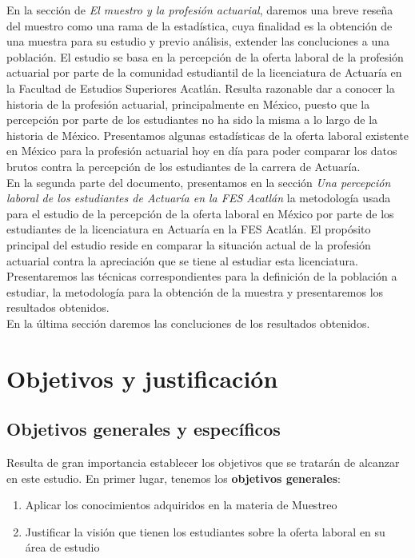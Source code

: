 \documentclass[a4paper]{article}
\begin{document}
En la sección de \textit{El muestro y la profesión actuarial}, daremos una breve reseña del muestro como una rama de la estadística, cuya finalidad es la obtención de una muestra para su estudio y previo análisis, extender las concluciones a una población. El estudio se basa en la percepción de la oferta laboral de la profesión actuarial por parte de la comunidad estudiantil de la licenciatura de Actuaría en la Facultad de Estudios Superiores Acatlán.
Resulta razonable dar a conocer la historia de la profesión actuarial, principalmente en México, puesto que la percepción por parte de los estudiantes no ha sido la misma a lo largo de la historia de México. Presentamos algunas estadísticas de la oferta laboral existente en México para la profesión actuarial hoy en día para poder comparar los datos brutos contra la percepción de los estudiantes de la carrera de Actuaría.\\

En la segunda parte del documento, presentamos en la sección \textit{Una percepción laboral de los estudiantes de Actuaría en la FES Acatlán} la metodología usada para el estudio de la percepción de la oferta laboral en México por parte de los estudiantes de la licenciatura en Actuaría en la FES Acatlán. El propósito principal del estudio reside en comparar la situación actual de la profesión actuarial contra la apreciación que se tiene al estudiar esta licenciatura.
Presentaremos las técnicas correspondientes para la definición de la población a estudiar, la metodología para la obtención de la muestra y presentaremos los resultados obtenidos.\\

En la última sección daremos las concluciones de los resultados obtenidos.
 
\section{Objetivos y justificación}
\subsection{Objetivos generales y específicos}
Resulta de gran importancia establecer los objetivos que se tratarán de alcanzar en este estudio. En primer lugar, tenemos los \textbf{objetivos generales}:

\begin{enumerate}
	\item Aplicar los conocimientos adquiridos en la materia de Muestreo
	\item Justificar la visión que tienen los estudiantes sobre la oferta laboral en su área de estudio
\end{enumerate}
\end{document}

